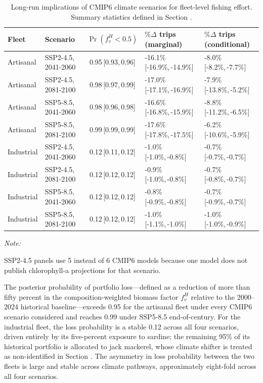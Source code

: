 \documentclass[
  11pt,
]{article}
\begin{document}
\begin{table}[!h]
\centering
\caption{\label{tab:tripcompstat}Long-run implications of CMIP6 climate scenarios for fleet-level fishing effort. Summary statistics defined in Section \emph{}. \label{tab:trip_compstat}}
\centering
\fontsize{9}{11}\selectfont
\begin{threeparttable}
\begin{tabular}[t]{llcll}
\toprule
Fleet & Scenario & $\Pr(f^H_v < 0.5)$ & $\%\Delta$ trips (marginal) & $\%\Delta$ trips (conditional)\\
\midrule
Artisanal & SSP2-4.5, 2041-2060 & 0.95\,[0.93,\,0.96] & -16.1\%\,[-16.9\%,\,-14.9\%] & -8.0\%\,[-8.2\%,\,-7.7\%]\\
Artisanal & SSP2-4.5, 2081-2100 & 0.98\,[0.97,\,0.99] & -17.0\%\,[-17.1\%,\,-16.9\%] & -7.9\%\,[-13.8\%,\,-5.2\%]\\
Artisanal & SSP5-8.5, 2041-2060 & 0.98\,[0.96,\,0.98] & -16.6\%\,[-16.8\%,\,-15.9\%] & -8.8\%\,[-11.2\%,\,-6.5\%]\\
Artisanal & SSP5-8.5, 2081-2100 & 0.99\,[0.99,\,0.99] & -17.6\%\,[-17.8\%,\,-17.5\%] & -6.2\%\,[-10.6\%,\,-5.9\%]\\
Industrial & SSP2-4.5, 2041-2060 & 0.12\,[0.11,\,0.12] & -1.0\%\,[-1.0\%,\,-0.8\%] & -0.7\%\,[-0.7\%,\,-0.7\%]\\
Industrial & SSP2-4.5, 2081-2100 & 0.12\,[0.12,\,0.12] & -0.9\%\,[-1.0\%,\,-0.8\%] & -0.7\%\,[-0.8\%,\,-0.7\%]\\
Industrial & SSP5-8.5, 2041-2060 & 0.12\,[0.12,\,0.12] & -0.8\%\,[-0.9\%,\,-0.8\%] & -0.7\%\,[-0.9\%,\,-0.7\%]\\
Industrial & SSP5-8.5, 2081-2100 & 0.12\,[0.12,\,0.12] & -1.0\%\,[-1.1\%,\,-1.0\%] & -1.0\%\,[-1.0\%,\,-0.9\%]\\
\bottomrule
\end{tabular}
\begin{tablenotes}
\item \textit{Note:} 
\item SSP2-4.5 panels use 5 instead of 6 CMIP6 models because one model does not publish chlorophyll-a projections for that scenario.
\end{tablenotes}
\end{threeparttable}
\end{table}

The posterior probability of portfolio loss---defined as a reduction of more than fifty percent in the composition-weighted biomass factor \(f^H_v\) relative to the 2000--2024 historical baseline---exceeds 0.95 for the artisanal fleet under every CMIP6 scenario considered and reaches 0.99 under SSP5-8.5 end-of-century. For the industrial fleet, the loss probability is a stable 0.12 across all four scenarios, driven entirely by its five-percent exposure to sardine; the remaining 95\% of its historical portfolio is allocated to jack mackerel, whose climate shifter is treated as non-identified in Section \emph{}. The asymmetry in loss probability between the two fleets is large and stable across climate pathways, approximately eight-fold across all four scenarios.
\end{document}
